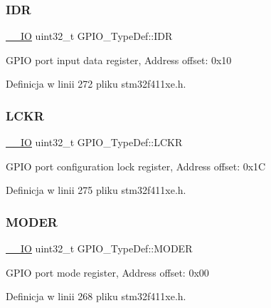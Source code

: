 \subsubsection{\texorpdfstring{I\+DR}{IDR}}
{\footnotesize\ttfamily \hyperlink{core__sc300_8h_aec43007d9998a0a0e01faede4133d6be}{\+\_\+\+\_\+\+IO} uint32\+\_\+t G\+P\+I\+O\+\_\+\+Type\+Def\+::\+I\+DR}

G\+P\+IO port input data register, Address offset\+: 0x10 

Definicja w linii 272 pliku stm32f411xe.\+h.

\mbox{\label{struct_g_p_i_o___type_def_a95a59d4b1d52be521f3246028be32f3e}} 
\subsubsection{\texorpdfstring{L\+C\+KR}{LCKR}}
{\footnotesize\ttfamily \hyperlink{core__sc300_8h_aec43007d9998a0a0e01faede4133d6be}{\+\_\+\+\_\+\+IO} uint32\+\_\+t G\+P\+I\+O\+\_\+\+Type\+Def\+::\+L\+C\+KR}

G\+P\+IO port configuration lock register, Address offset\+: 0x1C 

Definicja w linii 275 pliku stm32f411xe.\+h.

\mbox{\label{struct_g_p_i_o___type_def_ac2505d096b6b650f1647b8e0ff8b196b}} 
\subsubsection{\texorpdfstring{M\+O\+D\+ER}{MODER}}
{\footnotesize\ttfamily \hyperlink{core__sc300_8h_aec43007d9998a0a0e01faede4133d6be}{\+\_\+\+\_\+\+IO} uint32\+\_\+t G\+P\+I\+O\+\_\+\+Type\+Def\+::\+M\+O\+D\+ER}

G\+P\+IO port mode register, Address offset\+: 0x00 

Definicja w linii 268 pliku stm32f411xe.\+h.

\mbox{\label{struct_g_p_i_o___type_def_a6fb78f4a978a36032cdeac93ac3c9c8b}} 
